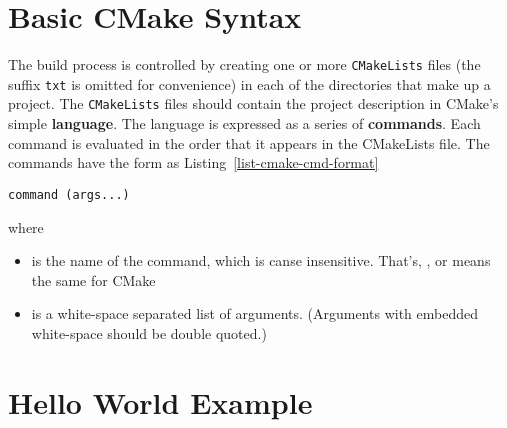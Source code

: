 \section{Basic CMake Syntax}
The build process is controlled by creating one or more \texttt{CMakeLists} files (the suffix \texttt{txt} is omitted for convenience) in each of the directories that make up a project. The \texttt{CMakeLists} files should contain the project description in CMake's simple \textbf{language}. The language is expressed as a series of \textbf{commands}. Each command is evaluated in the order that it appears in the CMakeLists file. The commands have the form as Listing~\ref{list-cmake-cmd-format}
\begin{lstlisting}[caption={Command format in CMakeLists},label=list-cmake-cmd-format]
command (args...)
\end{lstlisting}
where 
  \begin{itemize}  
    \item {} is the name of the command, which is canse insensitive. That's, ,  or  means the same for CMake
    \item {} is a white-space separated list of arguments. (Arguments with embedded white-space should be double quoted.)
  \end{itemize}  
\section{Hello World Example}

